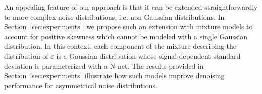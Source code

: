 \documentclass{article}
\begin{document}
An appealing feature of our approach is that it can be extended straightforwardly to more complex noise distributions, i.e. non Gaussian distributions. In Section~\ref{sec:experiments}, we propose such an extension with mixture models  to account for positive skewness which cannot be modeled with a single Gaussian distribution. In this context, each component of the mixture describing the distribution of $\varepsilon$ is a Gaussian distribution whose signal-dependent standard deviation is parameterized with a N-net. The results provided in Section~\ref{sec:experiments} illustrate how such models improve denoising performance for asymmetrical noise distributions.





\end{document}
